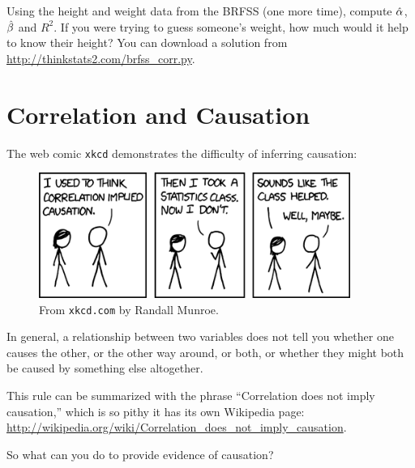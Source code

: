 \documentclass[12pt]{book}
\begin{document}
\begin{exercise}
Using the height and weight data from the BRFSS (one more time),
compute $\hat{\alpha}$, $\hat{\beta}$ and $R^{2}$.  If you were trying to guess
someone's weight, how much would it help to know their height?
You can download a solution from
\url{http://thinkstats2.com/brfss_corr.py}.

\end{exercise}


\section{Correlation and Causation}

The web comic {\tt xkcd} demonstrates the difficulty of inferring
causation:

\begin{figure}
\centerline{\includegraphics[width=4.0in]{figs/correlation.png}}
\caption{From {\tt xkcd.com} by Randall Munroe.}
\end{figure}

In general, a relationship between two variables does not tell you
whether one causes the other, or the other way around, or both, or
whether they might both be caused by something else altogether.

This rule can be summarized with the phrase ``Correlation
does not imply causation,'' which is so pithy it has its own
Wikipedia page: \url{http://wikipedia.org/wiki/Correlation_does_not_imply_causation}.

So what can you do to provide evidence of causation?
\end{document}
